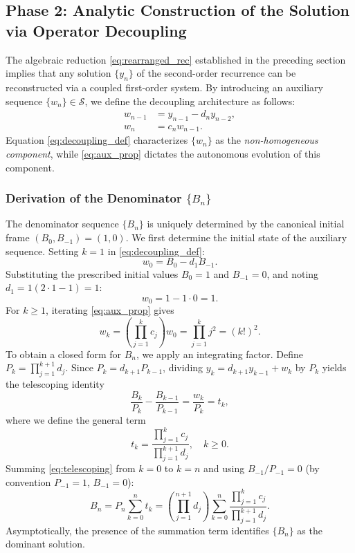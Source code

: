 \documentclass[pdflatex,sn-mathphys-num]{sn-jnl}
\theoremstyle{thmstyleone}
\theoremstyle{thmstyletwo}
\theoremstyle{thmstylethree}
\begin{document}
	
	\subsection{Phase 2: Analytic Construction of the Solution via Operator Decoupling}
	
	The algebraic reduction \eqref{eq:rearranged_rec} established in the preceding section implies that any solution $\{y_n\}$ of the second-order recurrence can be reconstructed via a coupled first-order system. By introducing an auxiliary sequence $\{w_n\} \in \mathcal{S}$, we define the decoupling architecture as follows:
	\begin{align}
		w_{n-1} &= y_{n-1} - d_n y_{n-2}, \label{eq:decoupling_def} \\
		w_{n} &= c_{n} w_{n-1}. \label{eq:aux_prop}
	\end{align}
	Equation \eqref{eq:decoupling_def} characterizes $\{w_n\}$ as the \textit{non-homogeneous component}, while \eqref{eq:aux_prop} dictates the autonomous evolution of this component.
	
	\subsubsection{Derivation of the Denominator $\{B_n\}$}
	The denominator sequence $\{B_n\}$ is uniquely determined by the canonical initial frame $(B_0, B_{-1}) = (1, 0)$. We first determine the initial state of the auxiliary sequence. Setting $k=1$ in \eqref{eq:decoupling_def}:
	\begin{equation}
		w_0 = B_0 - d_1 B_{-1}.
	\end{equation}
	Substituting the prescribed initial values $B_0 = 1$ and $B_{-1} = 0$, and noting $d_1 = 1(2\cdot 1-1) = 1$:
	\begin{equation}
		w_0 = 1 - 1\cdot 0 = 1.
	\end{equation}
	For $k \ge 1$, iterating \eqref{eq:aux_prop} gives
	\begin{equation}\label{eq:wk_product}
		w_k = \left(\prod_{j=1}^{k} c_j\right) w_0 = \prod_{j=1}^{k} j^2 = (k!)^2.
	\end{equation}
	To obtain a closed form for $B_n$, we apply an integrating factor. Define $P_k = \prod_{j=1}^{k+1} d_j$. Since $P_k = d_{k+1} P_{k-1}$, dividing $y_k = d_{k+1} y_{k-1} + w_k$ by $P_k$ yields the telescoping identity
	\begin{equation}\label{eq:telescoping}
		\frac{B_k}{P_k} - \frac{B_{k-1}}{P_{k-1}} = \frac{w_k}{P_k} = t_k,
	\end{equation}
	where we define the general term
	\begin{equation}\label{eq:tk_def}
		t_k = \frac{\prod_{j=1}^{k} c_j}{\prod_{j=1}^{k+1} d_j}, \quad k \ge 0.
	\end{equation}
	Summing \eqref{eq:telescoping} from $k=0$ to $k=n$ and using $B_{-1}/P_{-1} = 0$ (by convention $P_{-1}=1$, $B_{-1}=0$):
	\begin{equation}\label{eq:Bn_sum_final}
		B_n = P_n \sum_{k=0}^{n} t_k = \left( \prod_{j=1}^{n+1} d_j \right) \sum_{k=0}^{n} \frac{\prod_{j=1}^{k} c_j}{\prod_{j=1}^{k+1} d_j}.
	\end{equation}
	Asymptotically, the presence of the summation term identifies $\{B_n\}$ as the dominant solution.
	
\end{document}
